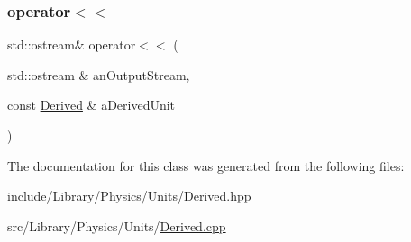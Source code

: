 \subsubsection{\texorpdfstring{operator$<$$<$}{operator<<}}
{\footnotesize\ttfamily std\+::ostream\& operator$<$$<$ (\begin{DoxyParamCaption}\item[{std\+::ostream \&}]{an\+Output\+Stream,  }\item[{const \hyperlink{classlibrary_1_1physics_1_1units_1_1_derived}{Derived} \&}]{a\+Derived\+Unit }\end{DoxyParamCaption})\hspace{0.3cm}{\ttfamily [friend]}}



The documentation for this class was generated from the following files\+:\begin{DoxyCompactItemize}
\item 
include/\+Library/\+Physics/\+Units/\hyperlink{_derived_8hpp}{Derived.\+hpp}\item 
src/\+Library/\+Physics/\+Units/\hyperlink{_derived_8cpp}{Derived.\+cpp}\end{DoxyCompactItemize}
